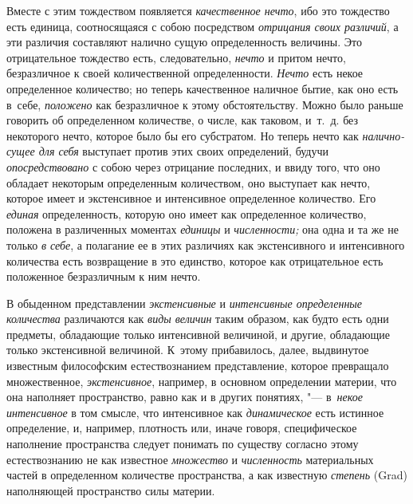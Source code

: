 Вместе с этим тождеством появляется {\em качественное нечто}, ибо это тождество
есть единица, соотносящаяся с собою посредством {\em отрицания своих различий},
а эти различия составляют налично сущую определенность величины. Это
отрицательное тождество есть, следовательно, {\em нечто} и притом нечто,
безразличное к своей количественной определенности. {\em Нечто} есть некое
определенное количество; но теперь качественное наличное бытие, как оно есть
в~себе, {\em положено} как безразличное к этому обстоятельству. Можно было
раньше говорить об определенном количестве, о числе, как таковом, и~т.~д. без
некоторого нечто, которое было бы его субстратом. Но теперь нечто как
{\em налично-сущее для себя} выступает против этих своих определений, будучи
{\em опосредствовано} с собою через отрицание последних, и ввиду того, что оно
обладает некоторым определенным количеством, оно выступает как нечто, которое
имеет и экстенсивное и интенсивное определенное количество. Его {\em единая}
определенность, которую оно имеет как определенное количество, положена в
различенных моментах {\em единицы} и {\em численности;} она одна и та же не
только {\em в себе}, а полагание ее в этих различиях как экстенсивного и
интенсивного количества есть возвращение в это единство, которое как
отрицательное есть положенное безразличным к ним нечто.


В обыденном представлении {\em экстенсивные} и {\em интенсивные определенные
количества} различаются как {\em виды величин} таким образом, как будто есть
одни предметы, обладающие только интенсивной величиной, и другие, обладающие
только экстенсивной величиной. К~этому прибавилось, далее, выдвинутое известным
философским естествознанием представление, которое превращало множественное,
{\em экстенсивное}, например, в основном определении материи, что она наполняет
пространство, равно как и в других понятиях, "--- в~{\em некое интенсивное} в
том смысле, что интенсивное как {\em динамическое} есть истинное определение,
и, например, плотность или, иначе говоря, специфическое наполнение пространства
следует понимать по существу согласно этому естествознанию не как известное
{\em множество} и {\em численность} материальных частей в определенном
количестве пространства, а как известную {\em степень} (Grad) наполняющей
пространство силы материи.

